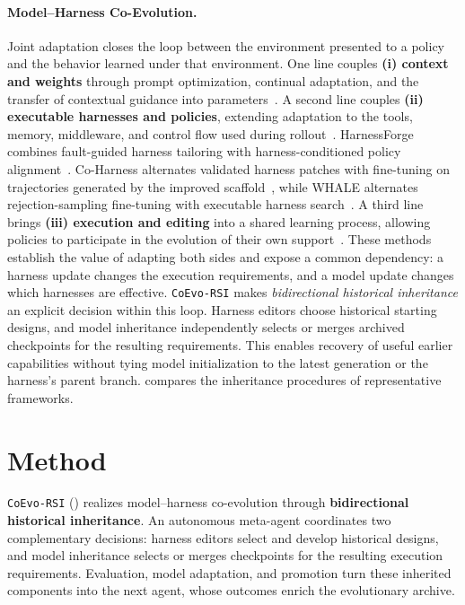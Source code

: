 \documentclass[11pt,a4paper]{article}
\newcommand{\ourmethod}{\texttt{CoEvo-RSI}}
\begin{document}
\paragraph{Model--Harness Co-Evolution.}
Joint adaptation closes the loop between the environment presented to a policy and the behavior learned under that environment. One line couples \textbf{(i) context and weights} through prompt optimization, continual adaptation, and the transfer of contextual guidance into parameters~\citep{lu2026p2o,tiwari2026fst,tu2026ucob,zhao2026ophsd}. A second line couples \textbf{(ii) executable harnesses and policies}, extending adaptation to the tools, memory, middleware, and control flow used during rollout~\citep{chen2026harnessforge,chen2026harnessx,chen2026coharness,kim2026whale,qi2026vace,qu2026qwenplanneragent,hebbar2026sia,karten2026continualharness,mao2026safeevolve,taolive2026hat,yu2026onpolicycorrection}. HarnessForge combines fault-guided harness tailoring with harness-conditioned policy alignment~\citep{chen2026harnessforge}. Co-Harness alternates validated harness patches with fine-tuning on trajectories generated by the improved scaffold~\citep{chen2026coharness}, while WHALE alternates rejection-sampling fine-tuning with executable harness search~\citep{kim2026whale}. A third line brings \textbf{(iii) execution and editing} into a shared learning process, allowing policies to participate in the evolution of their own support~\citep{luo2026hase,shi2026skill1}. These methods establish the value of adapting both sides and expose a common dependency: a harness update changes the execution requirements, and a model update changes which harnesses are effective. \ourmethod{} makes \emph{bidirectional historical inheritance} an explicit decision within this loop. Harness editors choose historical starting designs, and model inheritance independently selects or merges archived checkpoints for the resulting requirements. This enables recovery of useful earlier capabilities without tying model initialization to the latest generation or the harness's parent branch.  compares the inheritance procedures of representative frameworks.


\section{Method}
\label{sec:method}

\ourmethod{} () realizes model--harness co-evolution through \textbf{bidirectional historical inheritance}. An autonomous meta-agent coordinates two complementary decisions: harness editors select and develop historical designs, and model inheritance selects or merges checkpoints for the resulting execution requirements. Evaluation, model adaptation, and promotion turn these inherited components into the next agent, whose outcomes enrich the evolutionary archive.
\end{document}

